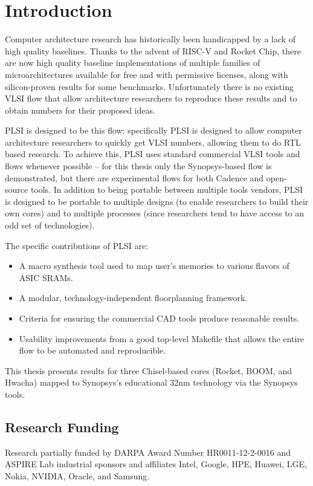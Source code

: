 \documentclass{article}
\begin{document}
\chapter{Introduction}

Computer architecture research has historically been handicapped by a lack of
high quality baselines.  Thanks to the advent of RISC-V and Rocket Chip, there
are now high quality baseline implementations of multiple families of
microarchitectures available for free and with permissive licenses, along with
silicon-proven results for some benchmarks.  Unfortunately there is no existing
VLSI flow that allow architecture researchers to reproduce these results and to
obtain numbers for their proposed ideas.

PLSI is designed to be this flow: specifically PLSI is designed to allow
computer architecture researchers to quickly get VLSI numbers, allowing them to
do RTL based research.  To achieve this, PLSI uses standard commercial VLSI
tools and flows whenever possible -- for this thesis only the Synopsys-based
flow is demonstrated, but there are experimental flows for both Cadence and
open-source tools.  In addition to being portable between multiple tools
vendors, PLSI is designed to be portable to multiple designs (to enable
researchers to build their own cores) and to multiple processes (since
researchers tend to have access to an odd set of technologies).

The specific contributions of PLSI are:

\begin{itemize}
\item A macro synthesis tool used to map user's memories to various flavors of
ASIC SRAMs.
\item A modular, technology-independent floorplanning framework.
\item Criteria for ensuring the commercial CAD tools produce reasonable results.
\item Usability improvements from a good top-level Makefile that allows the
entire flow to be automated and reproducible.
\end{itemize}

This thesis presents results for three Chisel-based cores (Rocket, BOOM, and
Hwacha) mapped to Synopsys's educational 32nm technology via the Synopsys
tools.

\section{Research Funding}

Research partially funded by DARPA Award Number HR0011-12-2-0016 and ASPIRE Lab
industrial sponsors and affiliates Intel, Google, HPE, Huawei, LGE, Nokia,
NVIDIA, Oracle, and Samsung.
\end{document}
